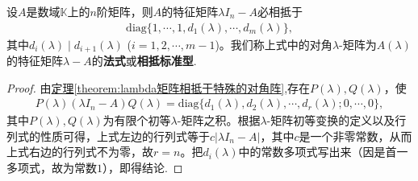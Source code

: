 \documentclass[../../main.tex]{subfiles}
\begin{document}
\begin{corollary}\label{corollary:特征矩阵的法式}
设$A$是数域$\mathbb{K}$上的$n$阶矩阵，则$A$的特征矩阵$\lambda I_n - A$必相抵于
\begin{align*}
\mathrm{diag}\{1,\cdots,1,d_1(\lambda),\cdots,d_m(\lambda)\},
\end{align*}
其中$d_i(\lambda)\mid d_{i + 1}(\lambda)$ ($i = 1,2,\cdots,m - 1$)。我们称上式中的对角$\lambda$-矩阵为$A(\lambda)$的特征矩阵$\lambda-A$的\textbf{法式}或\textbf{相抵标准型}. 
\end{corollary}
\begin{proof}
由\hyperref[theorem:lambda矩阵相抵于特殊的对角阵]{定理\ref{theorem:lambda矩阵相抵于特殊的对角阵}},存在$P(\lambda),Q(\lambda)$，使
\begin{align*}
P(\lambda)(\lambda I_n - A)Q(\lambda)=\mathrm{diag}\{d_1(\lambda),d_2(\lambda),\cdots,d_r(\lambda);0,\cdots,0\},
\end{align*}
其中$P(\lambda),Q(\lambda)$为有限个初等$\lambda$-矩阵之积。根据$\lambda$-矩阵初等变换的定义以及行列式的性质可得，上式左边的行列式等于$c|\lambda I_n - A|$，其中$c$是一个非零常数，从而上式右边的行列式不为零，故$r = n$。把$d_i(\lambda)$中的常数多项式写出来（因是首一多项式，故为常数$1$），即得结论.
\end{proof}
\end{document}
